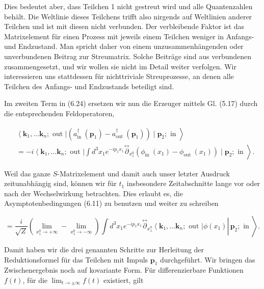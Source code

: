 \documentclass[10pt, letterpaper]{article}
\begin{document}
Dies bedeutet aber, dass Teilchen 1 nicht gestreut wird und alle Quantenzahlen behält. Die Weltlinie dieses Teilchens trifft also nirgends auf Weltlinien anderer Teilchen und ist mit diesen nicht verbunden. Der verbleibende Faktor ist das Matrixelement für einen Prozess mit jeweils einem Teilchen weniger in Anfangs- und Endzustand. Man spricht daher von einem unzusammenhängenden oder unverbundenen Beitrag zur Streumatrix. Solche Beiträge sind aus verbundenen zusammengesetzt, und wir wollen sie nicht im Detail weiter verfolgen. Wir interessieren uns stattdessen für nichttriviale Streuprozesse, an denen alle Teilchen des Anfangs- und Endzustands beteiligt sind.

Im zweiten Term in (6.24) ersetzen wir nun die Erzeuger mittels Gl. (5.17) durch die entsprechenden Feldoperatoren,

$$
\begin{aligned}
& \left.\left\langle\mathbf{k}_{1}, \ldots \mathbf{k}_{n} ; \text { out }\right|\left(a_{\text {in }}^{\dagger}\left(\mathbf{p}_{1}\right)-a_{\text {out }}^{\dagger}\left(\mathbf{p}_{1}\right)\right) \mid \mathbf{p}_{2} ; \text { in }\right\rangle \\
& \left.=-i\left\langle\mathbf{k}_{1}, \ldots \mathbf{k}_{n} ; \text { out }\right| \int d^{3} x_{1} e^{-i p_{1} x_{1}} \stackrel{\leftrightarrow}{\partial}_{x_{1}^{0}}\left(\phi_{\text {in }}\left(x_{1}\right)-\phi_{\text {out }}\left(x_{1}\right)\right) \mid \mathbf{p}_{2} ; \text { in }\right\rangle .
\end{aligned}
$$

Weil das ganze $S$-Matrixelement und damit auch unser letzter Ausdruck zeitunabhängig sind, können wir für $t_{1}$ insbesondere Zeitabschnitte lange vor oder nach der Wechselwirkung betrachten. Dies erlaubt es, die Asymptotenbedingungen (6.11) zu benutzen und weiter zu schreiben

$$
\left.\left.=\frac{i}{\sqrt{Z}}\left(\lim _{x_{1}^{0} \rightarrow+\infty}-\lim _{x_{1}^{0} \rightarrow-\infty}\right) \int d^{3} x_{1} e^{-i p_{1} x_{1}} \stackrel{\leftrightarrow}{\partial}_{x_{1}^{0}}\left\langle\mathbf{k}_{1}, \ldots \mathbf{k}_{n} ; \text { out }\right| \phi\left(x_{1}\right) \right\rvert\, \mathbf{p}_{2} ; \text { in }\right\rangle .
$$

Damit haben wir die drei genannten Schritte zur Herleitung der Reduktionsformel für das Teilchen mit Impuls $\mathbf{p}_{1}$ durchgeführt. Wir bringen das Zwischenergebnis noch auf kovariante Form. Für differenzierbare Funktionen $f(t)$, für die $\lim _{t \rightarrow \pm \infty} f(t)$ existiert, gilt
\end{document}

